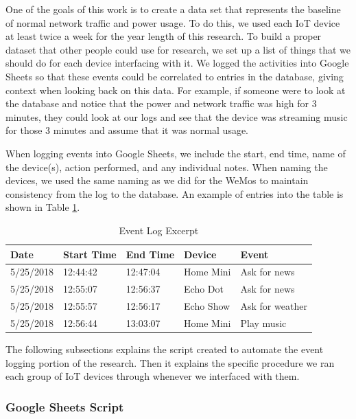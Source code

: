 One of the goals of this work is to create a data set that represents the baseline of normal network traffic and power usage. To do this, we used each IoT device at least twice a week for the year length of this research. To build a proper dataset that other people could use for research, we set up a list of things that we should do for each device interfacing with it. We logged the activities into Google Sheets so that these events could be correlated to entries in the database, giving context when looking back on this data. For example, if someone were to look at the database and notice that the power and network traffic was high for 3 minutes, they could look at our logs and see that the device was streaming music for those 3 minutes and assume that it was normal usage.

When logging events into Google Sheets, we include the start, end time, name of the device(s), action performed, and any individual notes. When naming the devices, we used the same naming as we did for the WeMos to maintain consistency from the log to the database. An example of entries into the table is shown in Table \ref{tab:events}.

\begin{table}[H]
    \centering
    \caption{Event Log Excerpt}
    \begin{tabular}{@{}lllll@{}}
        \toprule
        Date & Start Time & End Time & Device & Event \\ \midrule
        5/25/2018 & 12:44:42 & 12:47:04 & Home Mini & Ask for news \\
        5/25/2018 & 12:55:07 & 12:56:37 & Echo Dot & Ask for news \\
        5/25/2018 & 12:55:57 & 12:56:17 & Echo Show & Ask for weather \\
        5/25/2018 & 12:56:44 & 13:03:07 & Home Mini & Play music \\ \bottomrule
        \end{tabular}
    \label{tab:events}
\end{table}

The following subsections explains the script created to automate the event logging portion of the research. Then it explains the specific procedure we ran each group of IoT devices through whenever we interfaced with them.

\subsubsection{Google Sheets Script}

